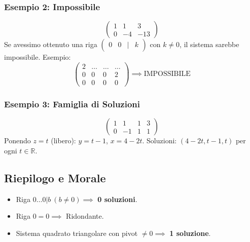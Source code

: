 \subsubsection{Esempio 2: Impossibile}
$$ \left(\begin{array}{cc|c} 1 & 1 & 3 \\ 0 & -4 & -13 \end{array}\right) $$
Se avessimo ottenuto una riga $\begin{pmatrix} 0 & 0 & | & k \end{pmatrix}$ con $k \neq 0$, il sistema sarebbe impossibile.
Esempio:
$$ \left(\begin{array}{ccc|c} 2 & \dots & \dots & \dots \\ 0 & 0 & 0 & 2 \\ 0 & 0 & 0 & 0 \end{array}\right) \implies \text{IMPOSSIBILE} $$

\subsubsection{Esempio 3: Famiglia di Soluzioni}
$$ \left(\begin{array}{ccc|c} 1 & 1 & 1 & 3 \\ 0 & -1 & 1 & 1 \end{array}\right) $$
Ponendo $z=t$ (libero): $y = t-1$, $x = 4-2t$.
Soluzioni: $(4-2t, t-1, t)$ per ogni $t \in \mathbb{R}$.

\subsection{Riepilogo e Morale}
\begin{itemize}
    \item Riga $0 \dots 0 | b \ (b \neq 0) \implies$ \textbf{0 soluzioni}.
    \item Riga $0=0 \implies$ Ridondante.
    \item Sistema quadrato triangolare con pivot $\neq 0 \implies$ \textbf{1 soluzione}.
\end{itemize}
